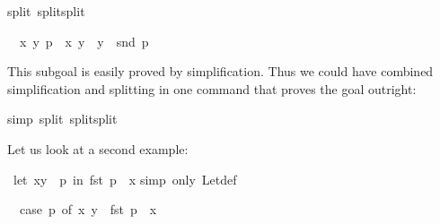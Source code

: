 \begin{isabellebody}
%
\isadelimproof
%
\endisadelimproof
%
\isatagproof
{}\isamarkupfalse%
{}split\ split{}split{}%
\begin{isamarkuptxt}%
\begin{isabelle}%
\ {}{}\ {}x\ y{}\ p\ {}\ {}x{}\ y{}\ {}\ y\ {}\ snd\ p%
\end{isabelle}
This subgoal is easily proved by simplification. Thus we could have combined
simplification and splitting in one command that proves the goal outright:%
\end{isamarkuptxt}%
\isamarkuptrue%
%
\endisatagproof
{\isafoldproof}%
%
\isadelimproof
%
\endisadelimproof
%
\isadelimproof
%
\endisadelimproof
%
\isatagproof
{}\isamarkupfalse%
{}simp\ split{}\ split{}split{}%
\endisatagproof
{\isafoldproof}%
%
\isadelimproof
%
\endisadelimproof
%
\begin{isamarkuptext}%
Let us look at a second example:%
\end{isamarkuptext}%
\isamarkuptrue%
\isamarkupfalse%
\ {}let\ {}x{}y{}\ {}\ p\ in\ fst\ p\ {}\ x{}\isanewline
%
\isadelimproof
%
\endisadelimproof
%
\isatagproof
{}\isamarkupfalse%
{}simp\ only{}\ Let{}def{}%
\begin{isamarkuptxt}%
\begin{isabelle}%
\ {}{}\ case\ p\ of\ {}x{}\ y{}\ {}\ fst\ p\ {}\ x%
\end{isabelle}

\end{isamarkuptxt}
\end{isabellebody}

